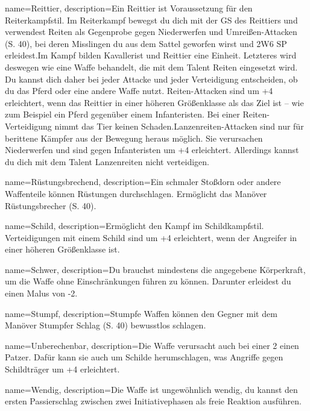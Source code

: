 {
    name={Reittier},
    description={Ein Reittier ist Voraussetzung für den Reiterkampfstil. Im Reiterkampf bewegst du dich mit der GS des Reittiers und verwendest Reiten als Gegenprobe gegen Niederwerfen und Umreißen-Attacken (S. 40), bei deren Misslingen du aus dem Sattel geworfen wirst und 2W6 SP erleidest.\newline     Im Kampf bilden Kavallerist und Reittier eine Einheit. Letzteres wird deswegen wie eine Waffe behandelt, die mit dem Talent Reiten eingesetzt wird. Du kannst dich daher bei jeder Attacke und jeder Verteidigung entscheiden, ob du das Pferd oder eine andere Waffe nutzt. Reiten-Attacken sind um +4 erleichtert, wenn das Reittier in einer höheren Größenklasse als das Ziel ist – wie zum Beispiel ein Pferd gegenüber einem Infanteristen. Bei einer Reiten-Verteidigung nimmt das Tier keinen Schaden.\newline     Lanzenreiten-Attacken sind nur für berittene Kämpfer aus der Bewegung heraus möglich. Sie verursachen Niederwerfen und sind gegen Infanteristen um +4 erleichtert. Allerdings kannst du dich mit dem Talent Lanzenreiten nicht verteidigen.}
}


{
    name={Rüstungsbrechend},
    description={Ein schmaler Stoßdorn oder andere Waffenteile können Rüstungen durchschlagen. Ermöglicht das Manöver Rüstungsbrecher (S. 40).}
}


{
    name={Schild},
    description={Ermöglicht den Kampf im Schildkampfstil. Verteidigungen mit einem Schild sind um +4 erleichtert, wenn der Angreifer in einer höheren Größenklasse ist.}
}


{
    name={Schwer},
    description={Du brauchst mindestens die angegebene Körperkraft, um die Waffe ohne Einschränkungen führen zu können. Darunter erleidest du einen Malus von -2.}
}


{
    name={Stumpf},
    description={Stumpfe Waffen können den Gegner mit dem Manöver Stumpfer Schlag (S. 40) bewusstlos schlagen.}
}


{
    name={Unberechenbar},
    description={Die Waffe verursacht auch bei einer 2 einen Patzer. Dafür kann sie auch um Schilde herumschlagen, was Angriffe gegen Schildträger um +4 erleichtert.}
}


{
    name={Wendig},
    description={Die Waffe ist ungewöhnlich wendig, du kannst den ersten Passierschlag zwischen zwei Initiativephasen als freie Reaktion ausführen.}
}


